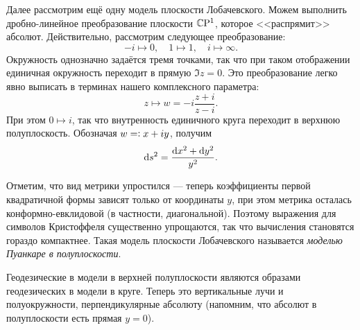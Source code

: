 Далее рассмотрим ещё одну модель плоскости Лобачевского. Можем выполнить дробно-линейное преобразование плоскости $\mathbb{C}\mathrm{P}^1$, которое <<распрямит>> абсолют. Действительно, рассмотрим следующее преобразование:
\[
	-i \mapsto 0,\quad 1 \mapsto 1,\quad i \mapsto \infty.
\]
Окружность однозначно задаётся тремя точками, так что при таком отображении единичная окружность переходит в прямую $\Im z = 0$. Это преобразование легко явно выписать в терминах нашего комплексного параметра:
\[
	z \mapsto w = -i\frac{z + i}{z - i}.
\]
При этом $0 \mapsto i$, так что внутренность единичного круга переходит в верхнюю полуплоскость. Обозначая $w = \vcentcolon x + iy$, получим
\[
	\mathop{}\!\mathrm{d} s^2 = \frac{\mathop{}\!\mathrm{d} x^2 + \mathop{}\!\mathrm{d} y^2}{y^2}.
\]

Отметим, что вид метрики упростился --- теперь коэффициенты первой квадратичной формы зависят только от координаты $y$, при этом метрика осталась конформно-евклидовой (в частности, диагональной). Поэтому выражения для символов Кристоффеля существенно упрощаются, так что вычисления становятся гораздо компактнее. Такая модель плоскости Лобачевского называется \textit{моделью Пуанкаре в полуплоскости}.

Геодезические в модели в верхней полуплоскости являются образами геодезических в модели в круге. Теперь это вертикальные лучи и полуокружности, перпендикулярные абсолюту (напомним, что абсолют в полуплоскости есть прямая $y = 0$).

